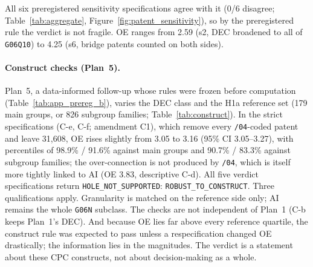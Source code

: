 All six preregistered sensitivity specifications agree with it (0/6 disagree; Table~\ref{tab:aggregate}, Figure~\ref{fig:patent_sensitivity}), so by the preregistered rule the verdict is not fragile. OE ranges from 2.59 (s2, DEC broadened to all of \texttt{G06Q10}) to 4.25 (s6, bridge patents counted on both sides).

\paragraph{Construct checks (Plan~5).} Plan~5, a data-informed follow-up whose rules were frozen before computation (Table~\ref{tab:app_prereg_b}), varies the DEC class and the H1a reference set (179 main groups, or 826 subgroup families; Table~\ref{tab:construct}). In the strict specifications (C-e, C-f; amendment C1), which remove every \texttt{/04}-coded patent and leave 31,608, OE rises slightly from 3.05 to 3.16 (95\% CI 3.05--3.27), with percentiles of 98.9\% / 91.6\% against main groups and 90.7\% / 83.3\% against subgroup families; the over-connection is not produced by \texttt{/04}, which is itself more tightly linked to AI (OE 3.83, descriptive C-d). All five verdict specifications return \texttt{HOLE\_\allowbreak NOT\_\allowbreak SUPPORTED}: \texttt{ROBUST\_\allowbreak TO\_\allowbreak CONSTRUCT}. Three qualifications apply. Granularity is matched on the reference side only; AI remains the whole \texttt{G06N} subclass. The checks are not independent of Plan~1 (C-b keeps Plan~1's DEC). And because OE lies far above every reference quartile, the construct rule was expected to pass unless a respecification changed OE drastically; the information lies in the magnitudes. The verdict is a statement about these CPC constructs, not about decision-making as a whole.

